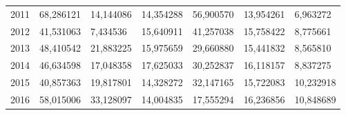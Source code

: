 \begin{table}
\begin{tabular}{p{1cm}p{2cm}p{2cm}p{2cm}p{2cm}p{2cm}p{2cm}}
 2011 &           68,286121 &                                          14,144086 & 14,354288 &          56,900570 &                       13,954261 &           6,963272 \\
 2012 &           41,531063 &                                           7,434536 & 15,640911 &          41,257038 &                       15,758422 &           8,775661 \\
 2013 &           48,410542 &                                          21,883225 & 15,975659 &          29,660880 &                       15,441832 &           8,565810 \\
 2014 &           46,634598 &                                          17,048358 & 17,625033 &          30,252837 &                       16,118157 &           8,837275 \\
 2015 &           40,857363 &                                          19,817801 & 14,328272 &          32,147165 &                       15,722083 &          10,232918 \\
 2016 &           58,015006 &                                          33,128097 & 14,004835 &          17,555294 &                       16,236856 &          10,848689 \\
\bottomrule
\end{tabular}
\end{table}
